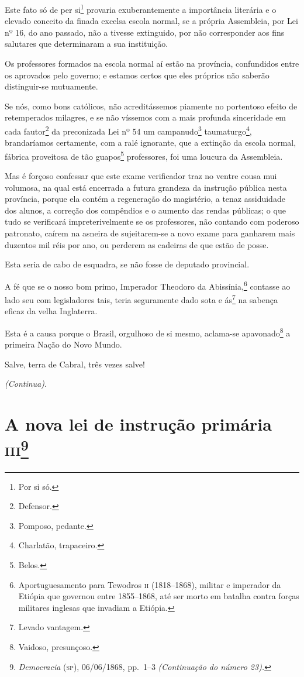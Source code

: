Este fato só de per si\footnote{Por si só.} provaria exuberantemente a
importância literária e o elevado conceito da finada excelsa escola
normal, se a própria Assembleia, por Lei nº 16, do ano passado, não a
tivesse extinguido, por não corresponder aos fins salutares que
determinaram a sua instituição.

Os professores formados na escola normal aí estão na província,
confundidos entre os aprovados pelo governo; e estamos certos que eles
próprios não saberão distinguir-se mutuamente.

Se nós, como bons católicos, não acreditássemos piamente no portentoso
efeito de retemperados milagres, e se não víssemos com a mais profunda
sinceridade em cada fautor\footnote{Defensor.} da preconizada Lei nº
54 um campanudo\footnote{Pomposo, pedante.} taumaturgo\footnote{
  Charlatão, trapaceiro.}, brandaríamos certamente, com a ralé
ignorante, que a extinção da escola normal, fábrica proveitosa de tão
guapos\footnote{Belos.} professores, foi uma loucura da Assembleia.

Mas é forçoso confessar que este exame verificador traz no ventre cousa
mui volumosa, na qual está encerrada a futura grandeza da instrução
pública nesta província, porque ela contém a regeneração do magistério,
a tenaz assiduidade dos alunos, a correção dos compêndios e o aumento
das rendas públicas; o que tudo se verificará impreterivelmente se os
professores, não contando com poderoso patronato, caírem na asneira de
sujeitarem-se a novo exame para ganharem mais duzentos mil réis por ano,
ou perderem as cadeiras de que estão de posse.

Esta seria de cabo de esquadra, se não fosse de deputado provincial.

A fé que se o nosso bom primo, Imperador Theodoro da
Abissínia,\footnote{Aportuguesamento para Tewodros \textsc{ii} (1818--1868),
  militar e imperador da Etiópia que governou entre 1855--1868, até ser
  morto em batalha contra forças militares inglesas que invadiam a
  Etiópia.} contasse ao lado seu com legisladores tais, teria
seguramente dado sota e ás\footnote{Levado vantagem.} na sabença
eficaz da velha Inglaterra.

Esta é a causa porque o Brasil, orgulhoso de si mesmo, aclama-se
apavonado\footnote{Vaidoso, presunçoso.} a primeira Nação do Novo
Mundo.

Salve, terra de Cabral, três vezes salve!

\emph{(Continua)}.

\chapter{A nova lei de instrução primária \textsc{iii}\footnote{\emph{Democracia} (\textsc{sp}), 06/06/1868, pp.~1--3 \emph{(Continuação do
  número 23).}}}

